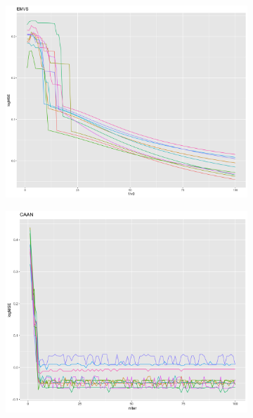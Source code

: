 \begin{figure}[tp]
     \centering
     \begin{subfigure}[b]{0.45\textwidth}
         \centering
         \includegraphics[width=\textwidth]{Figures/EMVS_MSE.png}
     \end{subfigure}
     \hfill
     \begin{subfigure}[b]{0.45\textwidth}
         \centering
         \includegraphics[width=\textwidth]{Figures/CAAN_MSE.png}
     \end{subfigure}
     \hfill
     \begin{subfigure}[b]{0.45\textwidth}

\end{subfigure}
\end{figure}
